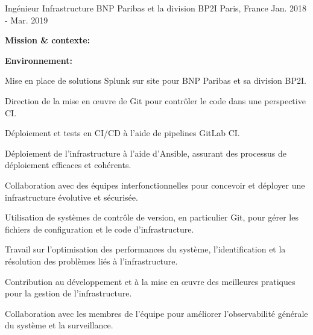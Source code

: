 \begin{cventries}
{\begin{cvitems}
{%
\cventry
{Ingénieur Infrastructure} %
{BNP Paribas et la division BP2I} %
{Paris, France} %
{Jan. 2018 - Mar. 2019} %
{
  \begin{cvitems} %
    \item {\textbf{Mission \& contexte:} }
    \item {\textbf{Environnement:} }
    \item {Mise en place de solutions Splunk sur site pour BNP Paribas et sa division BP2I.}
    \item {Direction de la mise en œuvre de Git pour contrôler le code dans une perspective CI.}
    \item {Déploiement et tests en CI/CD à l'aide de pipelines GitLab CI.}
    \item {Déploiement de l'infrastructure à l'aide d'Ansible, assurant des processus de déploiement efficaces et cohérents.}
    \item {Collaboration avec des équipes interfonctionnelles pour concevoir et déployer une infrastructure évolutive et sécurisée.}
    \item {Utilisation de systèmes de contrôle de version, en particulier Git, pour gérer les fichiers de configuration et le code d'infrastructure.}
    \item {Travail sur l'optimisation des performances du système, l'identification et la résolution des problèmes liés à l'infrastructure.}
    \item {Contribution au développement et à la mise en œuvre des meilleures pratiques pour la gestion de l'infrastructure.}
    \item {Collaboration avec les membres de l'équipe pour améliorer l'observabilité générale du système et la surveillance.}
  \end{cvitems}
}

}
\end{cvitems}}
\end{cventries}
